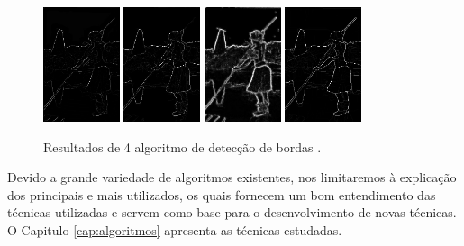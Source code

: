 \begin{figure}[!htb]
 \centering
 \def\baselinestretch{1}\small\normalsize
 \includegraphics[width=0.2\textwidth]{img/101087-77.jpg}\qquad
 \includegraphics[width=0.2\textwidth]{img/101087-80.jpg}  \qquad 
  \includegraphics[width=0.2\textwidth]{img/101087-82.jpg}  \qquad
 \includegraphics[width=0.2\textwidth]{img/101087-85.jpg}        
 \caption{\label{fig:indiosegmentado}Resultados de 4 algoritmo de detec\c{c}\~{a}o de bordas \citep{berkeley}.}
\end{figure}


Devido a  grande variedade de algoritmos existentes, nos limitaremos à explicação dos principais e mais utilizados, os quais fornecem um bom entendimento das técnicas utilizadas e servem como base para o desenvolvimento de novas técnicas. O Capitulo \ref{cap:algoritmos} apresenta as técnicas estudadas.



